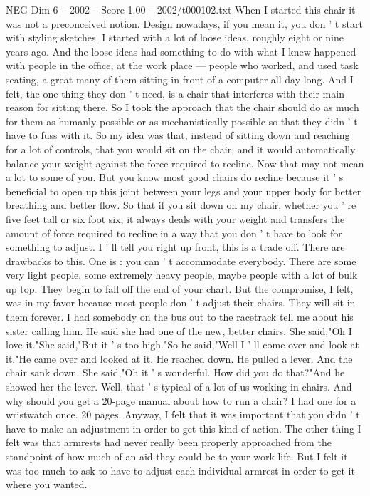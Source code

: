 \begin{textsample}{NEG Dim 6 – 2002 – Score 1.00 – 2002/t000102.txt}
When I started this chair it was not a preconceived notion.
Design nowadays, if you mean it, you don ' t start with styling sketches.
I started with a lot of loose ideas, roughly eight or nine years ago.
And the loose ideas had something to do with what I knew happened with people in the office, at the work place — people who worked, and used task seating, a great many of them sitting in front of a computer all day long.
And I felt, the one thing they don ' t need, is a chair that interferes with their main reason for sitting there.
So I took the approach that the chair should do as much for them as humanly possible or as mechanistically possible so that they didn ' t have to fuss with it.
So my idea was that, instead of sitting down and reaching for a lot of controls, that you would sit on the chair, and it would automatically balance your weight against the force required to recline.
Now that may not mean a lot to some of you.
But you know most good chairs do recline because it ' s beneficial to open up this joint between your legs and your upper body for better breathing and better flow.
So that if you sit down on my chair, whether you ' re five feet tall or six foot six, it always deals with your weight and transfers the amount of force required to recline in a way that you don ' t have to look for something to adjust.
I ' ll tell you right up front, this is a trade off.
There are drawbacks to this.
One is : you can ' t accommodate everybody.
There are some very light people, some extremely heavy people, maybe people with a lot of bulk up top.
They begin to fall off the end of your chart.
But the compromise, I felt, was in my favor because most people don ' t adjust their chairs.
They will sit in them forever.
I had somebody on the bus out to the racetrack tell me about his sister calling him.
He said she had one of the new, better chairs.
She said,"Oh I love it."She said,"But it ' s too high."So he said,"Well I ' ll come over and look at it."He came over and looked at it.
He reached down.
He pulled a lever.
And the chair sank down.
She said,"Oh it ' s wonderful.
How did you do that?"And he showed her the lever.
Well, that ' s typical of a lot of us working in chairs.
And why should you get a 20-page manual about how to run a chair?
I had one for a wristwatch once. 20 pages.
Anyway, I felt that it was important that you didn ' t have to make an adjustment in order to get this kind of action.
The other thing I felt was that armrests had never really been properly approached from the standpoint of how much of an aid they could be to your work life.
But I felt it was too much to ask to have to adjust each individual armrest in order to get it where you wanted.

\end{textsample}
